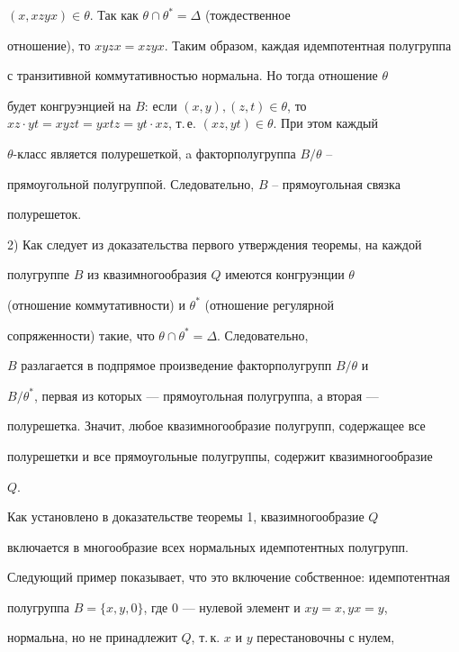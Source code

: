 \begin{pf}
$(x,xzyx)\in\theta$. Так как $\theta\cap\theta^*=\Delta$ (тождественное


отношение), то $xyzx=xzyx$. Таким образом, каждая идемпотентная полугруппа


с транзитивной коммутативностью нормальна. Но тогда отношение $\theta$


будет конгруэнцией на $B$: если $(x,y),(z,t)\in\theta$, то $xz\cdot


yt=xyzt=yxtz=yt\cdot xz$, т.\,е.  $(xz,yt)\in\theta$. При этом каждый


$\theta$-класс является полурешеткой, a факторполугруппа $B/\theta$ --


прямоугольной полугруппой.  Следовательно, $B$ -- прямоугольная связка


полурешеток.


\smallskip





2) Как следует из доказательства первого утверждения теоремы, на каждой


полугруппе $B$ из квазимногообразия $Q$ имеются конгруэнции $\theta$


(отношение коммутативности) и $\theta^*$ (отношение регулярной


сопряженности) такие, что $\theta\cap\theta^*=\Delta$. Следовательно,


$B$ разлагается в подпрямое произведение факторполугрупп $B/\theta$ и


$B/\theta^*$, первая из которых --- прямоугольная полугруппа, а вторая ---


полурешетка. Значит, любое квазимногообразие полугрупп, содержащее все


полурешетки и все прямоугольные полугруппы, содержит квазимногообразие


$Q$.


\end{pf}





Как установлено в доказательстве теоремы 1, квазимногообразие $Q$


включается в многообразие всех нормальных идемпотентных полугрупп.


Следующий пример показывает, что это включение собственное: идемпотентная


полугруппа $B=\{x,y,0\}$, где $0$ --- нулевой элемент и $xy=x, yx=y$,


нормальна, но не принадлежит $Q$, т.\,к. $x$ и $y$ перестановочны с нулем,


